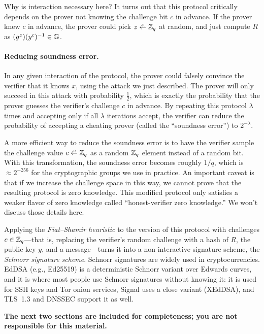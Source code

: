 Why is interaction necessary here?
It turns out that this protocol critically depends on the prover 
not knowing the challenge bit $c$
in advance.  If the prover knew $c$ in advance, the prover could pick
$z \getsr \Z_q$ at random, and just compute $R$ as $(g^z)(y^c)^{-1}\in \mathbb{G}$.

\paragraph{Reducing soundness error.}
In any given interaction of the protocol, the prover could falsely
convince the verifier that it knows $x$, using the attack we just
described. The prover will only succeed in this attack with probability $\frac 12$,
which is exactly the probability that the prover guesses the verifier's challenge
$c$ in advance.
By repeating this protocol $\lambda$ times and accepting only if all $\lambda$
iterations accept, the verifier
can reduce the probability of accepting a cheating prover (called the ``soundness
error'') to $2^{-\lambda}$.

A more efficient way to reduce the soundness error is to have 
the verifier sample the challenge value $c \getsr \Z_q$ as a
random $\mathbb{Z}_q$ element instead of a random bit.
With this transformation, the soundness error becomes roughly $1/q$,
which is $\approx 2^{-256}$ for the cryptographic groups we use in practice.
An important caveat is that if we increase the challenge space in this way,
we cannot prove that the resulting protocol is zero knowledge.
This modified protocol only
satisfies a weaker flavor of zero knowledge called ``honest-verifier zero knowledge.''
We won't discuss those details here.

Applying the \emph{Fiat--Shamir heuristic} to the version of this
protocol with challenges $c \in \mathbb{Z}_q$---that is, replacing the verifier's
random challenge with a hash of $R$, the public key $y$, and a message---turns
it into a non-interactive signature scheme, the \emph{Schnorr signature scheme}.
Schnorr signatures are widely used in cryptocurrencies.
EdDSA (e.g., Ed25519) is a deterministic Schnorr variant over Edwards curves,
and it is where most people use Schnorr signatures without knowing it:
it is used for SSH keys and Tor onion services, Signal uses a close
variant (XEdDSA), and TLS~1.3 and DNSSEC support it as well.

\vspace{0.1in}

\textbf{The next two sections are included for completeness; you are not responsible for this material.}

